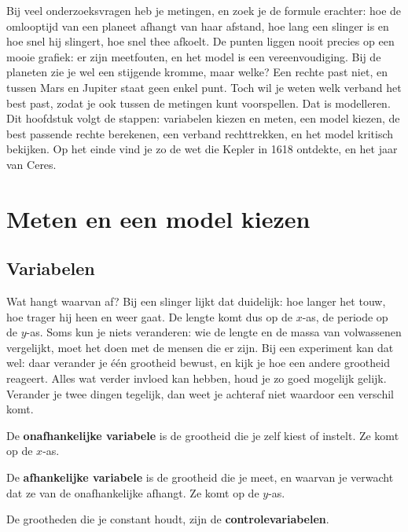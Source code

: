 Bij veel onderzoeksvragen heb je metingen, en zoek je de formule erachter: hoe de omlooptijd van een planeet afhangt van haar afstand, hoe lang een slinger is en hoe snel hij slingert, hoe snel thee afkoelt. De punten liggen nooit precies op een mooie grafiek: er zijn meetfouten, en het model is een vereenvoudiging. Bij de planeten zie je wel een stijgende kromme, maar welke? Een rechte past niet, en tussen Mars en Jupiter staat geen enkel punt. Toch wil je weten welk verband het best past, zodat je ook tussen de metingen kunt voorspellen. Dat is modelleren. Dit hoofdstuk volgt de stappen: variabelen kiezen en meten, een model kiezen, de best passende rechte berekenen, een verband rechttrekken, en het model kritisch bekijken. Op het einde vind je zo de wet die Kepler in 1618 ontdekte, en het jaar van Ceres.

\begin{oefeningen}[Start]

\end{oefeningen}

\section{Meten en een model kiezen}

\subsection{Variabelen}\label{sec:h2-variabelen}

Wat hangt waarvan af? Bij een slinger lijkt dat duidelijk: hoe langer het touw, hoe trager hij heen en weer gaat. De lengte komt dus op de $x$-as, de periode op de $y$-as. Soms kun je niets veranderen: wie de lengte en de massa van volwassenen vergelijkt, moet het doen met de mensen die er zijn. Bij een experiment kan dat wel: daar verander je één grootheid bewust, en kijk je hoe een andere grootheid reageert. Alles wat verder invloed kan hebben, houd je zo goed mogelijk gelijk. Verander je twee dingen tegelijk, dan weet je achteraf niet waardoor een verschil komt.

\begin{theorie}
De \textbf{\textcolor{accent}{onafhankelijke variabele}} is de grootheid die je zelf kiest of instelt. Ze komt op de $x$-as.

\vspace{1mm}
De \textbf{\textcolor{accent}{afhankelijke variabele}} is de grootheid die je meet, en waarvan je verwacht dat ze van de onafhankelijke afhangt. Ze komt op de $y$-as.

\vspace{1mm}
De grootheden die je constant houdt, zijn de \textbf{\textcolor{accent}{controlevariabelen}}.
\end{theorie}

